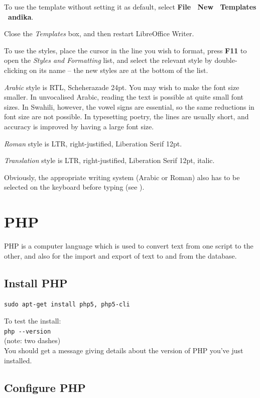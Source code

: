 To use the template without setting it as default, select \textbf{File \textrightarrow\ New \textrightarrow\ Templates \textrightarrow\ andika}.

Close the \textit{Templates} box, and then restart LibreOffice Writer.

To use the styles, place the cursor in the line you wish to format, press \textbf{F11} to open the \textit{Styles and Formatting} list, and select the relevant style by double-clicking on its name -- the new styles are at the bottom of the list.

\textit{Arabic} style is RTL, Scheherazade 24pt.  You may wish to make the font size smaller. In unvocalised Arabic, reading the text is possible at quite small font sizes. In Swahili, however, the vowel signs are essential, so the same reductions in font size are not possible.  In typesetting poetry, the lines are usually short, and accuracy is improved by having a large font size.

\textit{Roman} style is LTR, right-justified, Liberation Serif 12pt.

\textit{Translation} style is LTR, right-justified, Liberation Serif 12pt, italic.  

Obviously, the appropriate writing system (Arabic or Roman) also has to be selected on the keyboard before typing (see ).


\section{PHP}

PHP is a computer language which is used to convert text from one script to the other, and also for the import and export of text to and from the database.

\subsection{Install PHP}

\verb|sudo apt-get install php5, php5-cli|

To test the install:\\
\verb|php --version|\\
(note: two dashes)\\
You should get a message giving details about the version of PHP you've just installed.

\subsection{Configure PHP}

